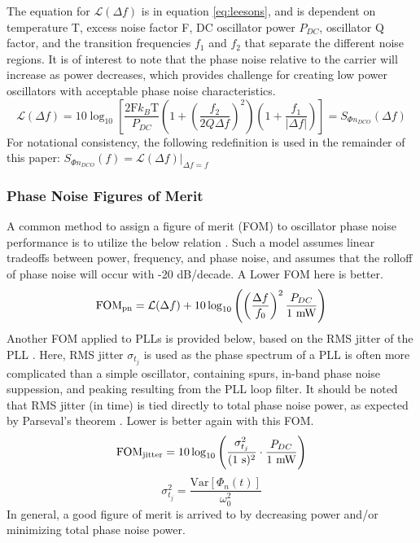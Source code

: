 		The equation for $\mathcal{L}(\Delta f)$ \cite{lee_hajimiri_2000} is in equation \ref{eq:leesons}, and is dependent on temperature T, excess noise factor F, DC oscillator power $P_{DC}$, oscillator Q factor, and the transition frequencies $f_1$ and $f_2$ that separate the different noise regions. It is of interest to note that the phase noise relative to the carrier will increase as power decreases, which provides challenge for creating low power oscillators with acceptable phase noise characteristics. 
		\begin{equation}\label{eq:leesons}
		\mathcal{L}(\Delta f) = 10\log_{10}\left[\frac{2\text{F}k_B\text{T}}{P_{DC}}\left(1+\left(\frac{f_2}{2Q\Delta f}\right)^2\right)\left(1+\frac{f_1}{|\Delta f|}\right)\right] = S_{\Phi n_{DCO}}(\Delta f)
		\end{equation}
		For notational consistency, the following redefinition is used in the remainder of this paper: $S_{\Phi n_{DCO}}(f) = \mathcal{L}(\Delta f)|_{\Delta f = f}$

	\subsubsection{Phase Noise Figures of Merit}
	A common method to assign a figure of merit (FOM) to oscillator phase noise performance is to utilize the below relation \cite{Kinget1999}. Such a model assumes linear tradeoffs between power, frequency, and phase noise, and assumes that the rolloff of phase noise will occur with -20 dB/decade. A Lower FOM here is better.
	\begin{equation}\label{eq:fom_pn}
		\textnormal{FOM}_{\textnormal{pn}} =  \mathcal{L}(\Delta f) + 10\log_{10}\left(\left(\frac{\Delta f}{f_0}\right)^2 \frac{P_{DC}}{\textnormal{1 mW}} \right)
	\end{equation}
	Another FOM applied to PLLs is provided below, based on the RMS jitter of the PLL \cite{XiangGao2009}. Here, RMS jitter $\sigma_{t_j}$ is used as the phase spectrum of a PLL is often more complicated than a simple oscillator, containing spurs, in-band phase noise suppession, and peaking resulting from the PLL loop filter. It should be noted that RMS jitter (in time) is tied directly to total phase noise power, as expected by Parseval's theorem \cite{parseval_1799}.  Lower is better again with this FOM. 
	\begin{equation}\label{eq:fom_jitter}
		\textnormal{FOM}_{\textnormal{jitter}} = 10\log_{10}\left(\frac{\sigma_{t_j}^2}{(\textnormal{1 s})^2}\cdot\frac{P_{DC}}{\textnormal{1 mW}}\right)
	\end{equation}
	\begin{equation}
		\sigma_{t_j}^2 = \frac{\mathrm{Var}[\Phi_{n}(t)]}{\omega_0^2}
	\end{equation}
	In general, a good figure of merit is arrived to by decreasing power and/or minimizing total phase noise power. 
	
